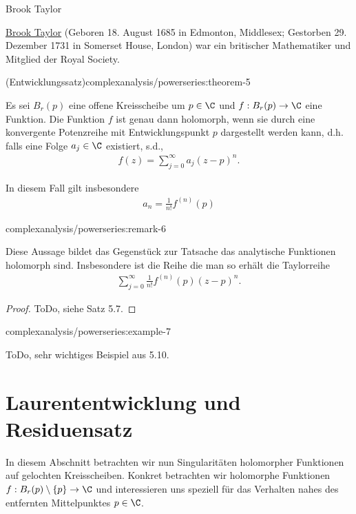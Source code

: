 \documentclass[letterpaper,10pt,german]{jupyterBook}
\begin{document}
\begin{emphBox}{Brook Taylor}{}

\par
\href{https://de.wikipedia.org/wiki/Brook\_Taylor}{Brook Taylor} (Geboren 18. August 1685 in Edmonton, Middlesex; Gestorben 29. Dezember 1731 in Somerset House, London) war ein britischer Mathematiker und Mitglied der Royal Society.
\end{emphBox}
\begin{theorem}{(Entwicklungssatz)}{complexanalysis/powerseries:theorem-5}



\par
Es sei \(B_r(p)\) eine offene Kreisscheibe um \(p\in\C\) und \(f:B_r(p)\to\C\) eine Funktion. Die Funktion \(f\) ist genau dann holomorph, wenn sie durch eine konvergente Potenzreihe mit Entwicklungspunkt \(p\) dargestellt werden kann, d.h. falls eine Folge \(a_j\in\C\) existiert, s.d.,
\begin{align*}
f(z) = \sum_{j=0}^\infty a_j (z-p)^n.
\end{align*}
\par
In diesem Fall gilt insbesondere
\begin{align*}
a_n = \frac{1}{n!} f^{(n)}(p)
\end{align*}\end{theorem}
\begin{remark}{}{complexanalysis/powerseries:remark-6}



\par
Diese Aussage bildet das Gegenstück zur Tatsache das analytische Funktionen holomorph sind. Insbesondere ist die Reihe die man so erhält die Taylorreihe
\begin{align*}
\sum_{j=0}^\infty \frac{1}{n!} f^{(n)}(p) (z-p)^n.
\end{align*}\end{remark}

\begin{proof}
 ToDo, siehe \cite{Nee17} Satz 5.7.
\end{proof}
\begin{example}{}{complexanalysis/powerseries:example-7}



\par
ToDo, sehr wichtiges Beispiel aus \cite{Nee17} 5.10.
\end{example}


\section{Laurententwicklung und Residuensatz}
\label{\detokenize{complexanalysis/residuensatz:laurententwicklung-und-residuensatz}}\label{\detokenize{complexanalysis/residuensatz::doc}}
\par
In diesem Abschnitt betrachten wir nun Singularitäten holomorpher Funktionen auf gelochten Kreisscheiben. Konkret betrachten wir holomorphe Funktionen \(f:B_r(p)\setminus\{p\}\to\C\) und interessieren uns speziell für das Verhalten nahes des entfernten Mittelpunktes \(p\in\C\).
\end{document}
